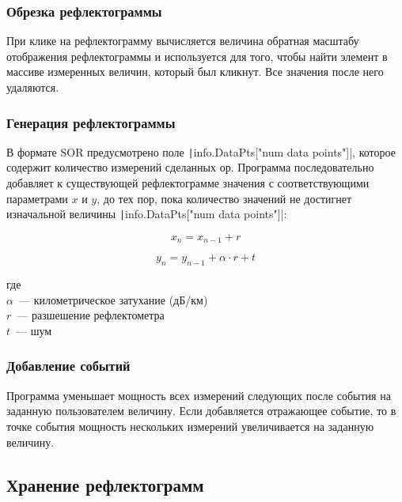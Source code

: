 \subsubsection{Обрезка рефлектограммы}

При клике на рефлектограмму вычисляется величина обратная масштабу отображения рефлектограммы и используется для того, чтобы найти элемент в массиве измеренных величин, который был кликнут. Все значения после него удаляются.

\subsubsection{Генерация рефлектограммы}

В формате SOR предусмотрено поле \texttt|info.DataPts["num data points"]|, которое содержит количество измерений сделанных \acrshort{ор}.
Программа последовательно добавляет к существующей рефлектограмме значения с соответствующими параметрами $x$ и $y$, до тех пор, пока количество значений не достигнет изначальной величины \texttt|info.DataPts["num data points"]|:

\begin{equation}
  \label{eqn:generate_x}
  x_n = x_{n-1} + r
\end{equation}

\begin{equation}
  \label{eqn:generate_y}
  y_n = y_{n-1} + \alpha \cdot r + t
\end{equation}

\noindent где \\
$\alpha$~--- километрическое затухание (дБ/км) \\
$r$~--- разшешение рефлектометра \\
$t$~--- шум

\subsubsection{Добавление событий}

Программа уменьшает мощность всех измерений следующих после события на заданную пользователем величину. 
Если добавляется отражающее событие, то в точке события мощность нескольких измерений увеличивается на заданную величину.

\subsection{Хранение рефлектограмм}

